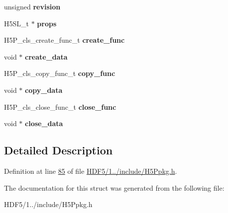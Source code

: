 \begin{DoxyCompactItemize}
unsigned {\bfseries revision}
\item 
\mbox{\label{struct_h5_p__genclass__t_a438347cf3a1b150bcff1a9b3ffd67bd6}} 
H5\+S\+L\+\_\+t $\ast$ {\bfseries props}
\item 
\mbox{\label{struct_h5_p__genclass__t_a76e662d666e815a700ed7957d63f61db}} 
H5\+P\+\_\+cls\+\_\+create\+\_\+func\+\_\+t {\bfseries create\+\_\+func}
\item 
\mbox{\label{struct_h5_p__genclass__t_a89268c279bdb8fac7eccebd10a0f7bfe}} 
void $\ast$ {\bfseries create\+\_\+data}
\item 
\mbox{\label{struct_h5_p__genclass__t_a8a12b0a08399a2df704ed7fd53e3cecc}} 
H5\+P\+\_\+cls\+\_\+copy\+\_\+func\+\_\+t {\bfseries copy\+\_\+func}
\item 
\mbox{\label{struct_h5_p__genclass__t_a8fa3313dcad968fbbe85a26824cba68f}} 
void $\ast$ {\bfseries copy\+\_\+data}
\item 
\mbox{\label{struct_h5_p__genclass__t_a257e1d65794f638e95f137046853d8c9}} 
H5\+P\+\_\+cls\+\_\+close\+\_\+func\+\_\+t {\bfseries close\+\_\+func}
\item 
\mbox{\label{struct_h5_p__genclass__t_af25145019f48f2a1ac8c469df50c8f3d}} 
void $\ast$ {\bfseries close\+\_\+data}
\end{DoxyCompactItemize}


\subsection{Detailed Description}


Definition at line \hyperlink{_h_d_f5_21_810_81_2include_2_h5_ppkg_8h_source_l00085}{85} of file \hyperlink{_h_d_f5_21_810_81_2include_2_h5_ppkg_8h_source}{H\+D\+F5/1../include/\+H5\+Ppkg.\+h}.



The documentation for this struct was generated from the following file\+:\begin{DoxyCompactItemize}
\item 
H\+D\+F5/1../include/\+H5\+Ppkg.\+h\end{DoxyCompactItemize}
